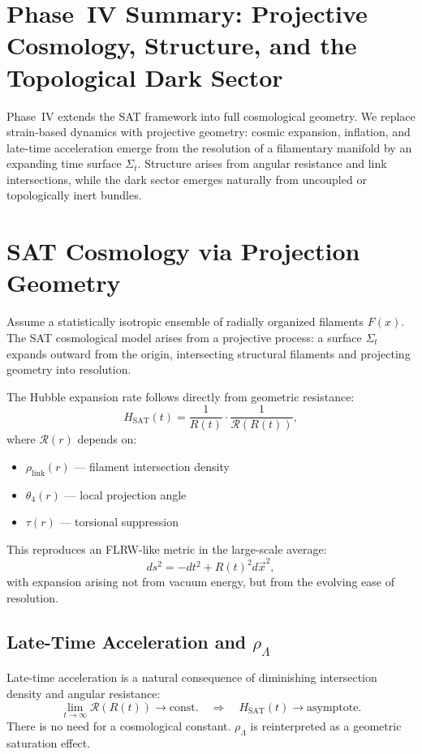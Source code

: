 
\section{Phase~IV Summary: Projective Cosmology, Structure, and the Topological Dark Sector}

Phase~IV extends the SAT framework into full cosmological geometry. 
We replace strain-based dynamics with projective geometry: cosmic expansion, inflation, and late-time acceleration emerge from the resolution of a filamentary manifold by an expanding time surface $\Sigma_t$. Structure arises from angular resistance and link intersections, while the dark sector emerges naturally from uncoupled or topologically inert bundles.

\tableofcontents

\section{SAT Cosmology via Projection Geometry}

Assume a statistically isotropic ensemble of radially organized filaments $F(x)$.
The SAT cosmological model arises from a projective process:
a surface $\Sigma_t$ expands outward from the origin, intersecting structural filaments and projecting geometry into resolution.

The Hubble expansion rate follows directly from geometric resistance:
\[
H_{\text{SAT}}(t) = \frac{1}{R(t)} \cdot \frac{1}{\mathcal{R}(R(t))},
\]
where $\mathcal{R}(r)$ depends on:
\begin{itemize}
  \item $\rho_{\text{link}}(r)$ — filament intersection density
  \item $\theta_4(r)$ — local projection angle
  \item $\tau(r)$ — torsional suppression
\end{itemize}

This reproduces an FLRW-like metric in the large-scale average:
\[
ds^2 = -dt^2 + R(t)^2 d\vec{x}^2,
\]
with expansion arising not from vacuum energy, but from the evolving ease of resolution.

\subsection{Late-Time Acceleration and $\rho_\Lambda$}
Late-time acceleration is a natural consequence of diminishing intersection density and angular resistance:
\[
\lim_{t \to \infty} \mathcal{R}(R(t)) \to \text{const.} \quad \Rightarrow \quad H_{\text{SAT}}(t) \to \text{asymptote}.
\]
There is no need for a cosmological constant. $\rho_\Lambda$ is reinterpreted as a geometric saturation effect.

